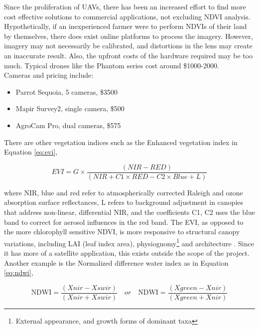 Since the proliferation of UAVs, there has been an increased effort to find more cost effective solutions to commercial applications, not excluding NDVI analysis. Hypothetically, if an inexperienced farmer were to perform NDVIs of their land by themselves, there does exist online platforms to process the imagery. However, imagery may not necessarily be calibrated, and distortions in the lens may create an inaccurate result. Also, the upfront costs of the hardware required may be too much. Typical drones like the Phantom series cost around \$1000-2000. \\Cameras and pricing include:
\begin{itemize}
	\item Parrot Sequoia, 5 cameras, \$3500 \cite{sequoia}
	\item Mapir Survey2, single camera, \$500 \cite{mapir}
	\item AgroCam Pro, dual cameras, \$575 \cite{agrocam}
\end{itemize}

There are other vegetation indices such as the Enhanced vegetation index in Equation \ref{eq:evi},

\begin{equation}\label{eq:evi}
EVI=G\times {\frac  {(NIR-RED)}{(NIR+C1\times RED-C2\times Blue+L)}}
\end{equation}

where NIR, blue and red refer to atmospherically corrected Raleigh and ozone absorption surface reflectances, L refers to background adjustment in canopies that address non-linear, differential NIR, and the coefficients C1, C2 uses the blue band to correct for aerosol influences in the red band. The EVI, as opposed to the more chlorophyll sensitive NDVI, is more responsive to structural canopy variations, including LAI (leaf index area), physiognomy\footnote{External appearance, and growth forms of dominant taxa} and architecture \cite{evi}. Since it has more of a satellite application, this exists outside the scope of the project.\\

Another example is the Normalized difference water index as in Equation \ref{eq:ndwi},

\begin{equation}\label{eq:ndwi}
{\displaystyle {\mbox{NDWI}}={\frac {(Xnir-Xswir)}{(Xnir+Xswir)}}}\quad or\quad {\displaystyle {\mbox{NDWI}}={\frac {(Xgreen-Xnir)}{(Xgreen+Xnir)}}}
\end{equation}

